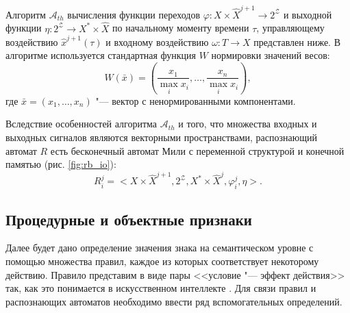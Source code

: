 \documentclass[a4paper, 12pt]{article}
\newcommand{\stretchsize}{2}
\renewcommand{\baselinestretch}{\stretchsize}
\numberwithin{equation}{section}
\begin{document}
	Алгоритм $\mathcal A_{th}$ вычисления функции переходов $\varphi:X\times\hat X^{j+1}\to 2^{\mathcal Z}$ и выходной функции $\eta:2^{\mathcal Z}\to X^*\times\hat X$ по начальному моменту времени $\tau$, управляющему воздействию $\hat x^{j+1}(\tau)$ и входному воздействию $\omega:T\to X$ представлен ниже. В алгоритме используется стандартная функция $W$ нормировки значений весов:
	\begin{equation*}
	W(\bar x)=\left(\frac{x_1}{\max\limits_i x_i},\dots,\frac{x_n}{\max\limits_i x_i}\right),
	\end{equation*} 
	где $\bar x=(x_1,\dots,x_n)$ "--- вектор с ненормированными компонентами.
	
	\renewcommand{\baselinestretch}{1}
	\begin{algorithm}[H]
		\label{alg:automato}
		\begin{algorithmic}[1]
			
		\end{algorithmic}
	\end{algorithm}
	\begin{algorithm}[H]
		\begin{algorithmic}[1]
			\algrestore{algst:store1}
			
		\end{algorithmic}
	\end{algorithm}
	\renewcommand{\baselinestretch}{\stretchsize}

	Вследствие особенностей алгоритма $\mathcal A_{th}$ и  того, что множества входных и выходных сигналов являются векторными пространствами, распознающий автомат $R$ есть бесконечный автомат Мили с переменной структурой и конечной памятью (рис. \ref{fig:rb_io}): 
	\begin{equation*}
	R_i^j=<X\times\hat X^{j+1}, 2^{\mathcal Z}, X^*\times\hat X^j,\varphi_i^j,\eta>.
	\end{equation*}

	\subsection{Процедурные и объектные признаки}
	Далее будет дано определение значения знака на семантическом уровне с помощью множества правил, каждое из которых соответствует некоторому действию. Правило представим в виде пары <<условие "--- эффект действия>> так, как это понимается в искусственном интеллекте \cite{Nilson1985, Osipov2002c}. Для связи правил и распознающих автоматов необходимо ввести ряд вспомогательных определений. 
\end{document}
